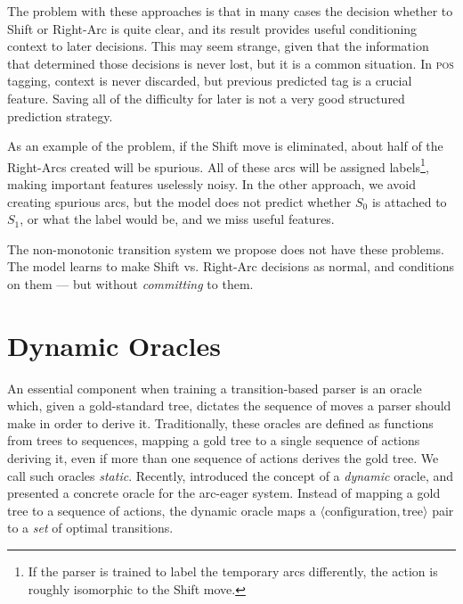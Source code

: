 \documentclass[11pt,letterpaper]{article}
\newcommand{\pos}{\textsc{pos}\xspace}
\newcommand{\tuple}[1]{$\langle#1\rangle$}
\newcommand{\maybe}[1]{\textcolor{gray}{#1}}
\begin{document}
The problem with these approaches is that in many cases the decision whether
to Shift or Right-Arc is quite clear, and its result provides useful
conditioning context to later decisions.
This may seem strange, given that the information that determined those decisions
is never lost, but it is a common situation. In \pos tagging, 
context is never discarded, but previous predicted tag is a crucial feature.
Saving all of the difficulty for later
is not a very good structured prediction strategy. 

As an example of the problem, if the Shift move is
eliminated, about half of the Right-Arcs created will be spurious. All of these
arcs will be assigned labels\footnote{If the parser is trained to label the temporary
arcs differently, the action is roughly isomorphic to the Shift move.},
making important features uselessly noisy. In the other approach, we avoid creating
spurious arcs, but the model does not predict whether $S_0$ is attached to $S_1$,
or what the label would be, and we miss useful features.


The non-monotonic transition system we propose does not have these problems.
The model learns to make Shift vs. Right-Arc decisions as normal, and conditions on them --- but
without \emph{committing} to them.

\section{Dynamic Oracles}
\label{ref:oracle}

 An essential component when training a transition-based parser is an oracle
 which, given a gold-standard tree, dictates the sequence of moves a parser
 should make in order to derive it.  Traditionally, these oracles are defined
 as functions from trees to sequences, mapping a gold tree to a single sequence
 of actions deriving it, even if more than one sequence of actions derives the
 gold tree. We call such oracles \emph{static}.  Recently, 
 \citet{goldberg:12} introduced the concept of a \emph{dynamic} oracle, and
 presented a concrete oracle for the arc-eager system.  Instead of mapping a
 gold tree to a sequence of actions, the dynamic oracle maps a
 \tuple{\text{configuration}, \text{tree}} pair to a \emph{set} of optimal transitions.
\end{document}
